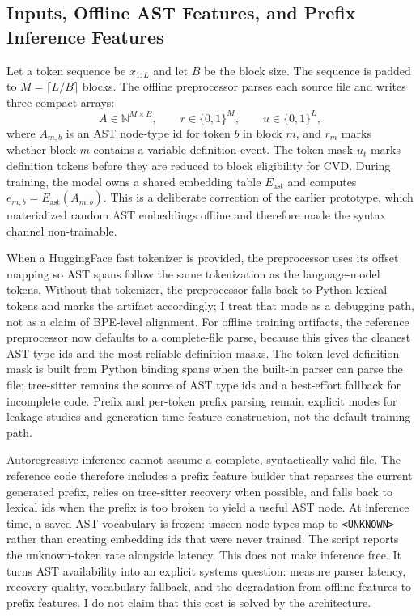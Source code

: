 \documentclass[10pt]{article}
\begin{document}
\subsection{Inputs, Offline AST Features, and Prefix Inference Features}

Let a token sequence be $x_{1:L}$ and let $B$ be the block size.  The sequence is
padded to $M=\lceil L/B\rceil$ blocks.  The offline preprocessor parses each
source file and writes three compact arrays:
\[
  A \in \mathbb{N}^{M \times B}, \qquad
  r \in \{0,1\}^{M}, \qquad
  u \in \{0,1\}^{L},
\]
where $A_{m,b}$ is an AST node-type id for token $b$ in block $m$, and $r_m$
marks whether block $m$ contains a variable-definition event.  The token mask
$u_t$ marks definition tokens before they are reduced to block eligibility for
CVD.  During training,
the model owns a shared embedding table $E_{\mathrm{ast}}$ and computes
$e_{m,b}=E_{\mathrm{ast}}(A_{m,b})$.  This is a deliberate correction of the
earlier prototype, which materialized random AST embeddings offline and therefore
made the syntax channel non-trainable.

When a HuggingFace fast tokenizer is provided, the preprocessor uses its offset
mapping so AST spans follow the same tokenization as the language-model tokens.
Without that tokenizer, the preprocessor falls back to Python lexical tokens and
marks the artifact accordingly; I treat that mode as a debugging path, not as a
claim of BPE-level alignment.  For offline training artifacts, the reference
preprocessor now defaults to a complete-file parse, because this gives the
cleanest AST type ids and the most reliable definition masks.  The token-level
definition mask is built from Python binding spans when the built-in parser can
parse the file; tree-sitter remains the source of AST type ids and a best-effort
fallback for incomplete code.  Prefix and per-token prefix parsing remain
explicit modes for leakage studies and generation-time feature construction,
not the default training path.

Autoregressive inference cannot assume a complete, syntactically valid file.
The reference code therefore includes a prefix feature builder that reparses the
current generated prefix, relies on tree-sitter recovery when possible, and
falls back to lexical ids when the prefix is too broken to yield a useful AST
node.  At inference time, a saved AST vocabulary is frozen: unseen node types map
to \texttt{<UNKNOWN>} rather than creating embedding ids that were never trained.
The script reports the unknown-token rate alongside latency.  This does not make
inference free.  It turns AST availability into an explicit systems question:
measure parser latency, recovery quality, vocabulary fallback, and the
degradation from offline features to prefix features.  I do not claim that this
cost is solved by the architecture.
\end{document}
